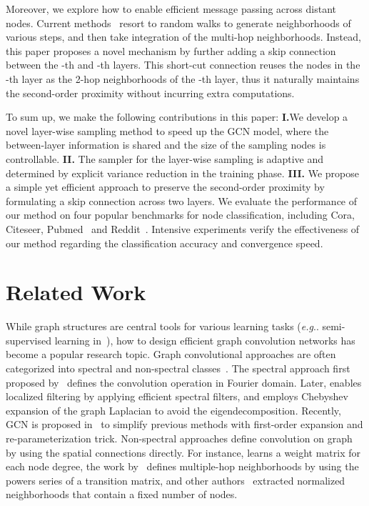 \documentclass{article}
\makeatletter
\DeclareRobustCommand\onedot{\futurelet\@let@token\@onedot}
\def\@onedot{\ifx\@let@token.\else.\null\fi\xspace}
\def\eg{\emph{e.g}\onedot} \def\Eg{\emph{E.g}\onedot}
\makeatother
\begin{document}
Moreover, we explore how to enable efficient message passing across distant nodes. Current methods~\cite{perozzi2014deepwalk,such2017robust} resort to random walks to generate neighborhoods of various steps, and then take integration of the multi-hop neighborhoods. Instead, this paper proposes a novel mechanism by further adding a skip connection between the -th and -th layers. This short-cut connection reuses the nodes in the -th layer as the 2-hop neighborhoods of the -th layer, thus it naturally maintains the second-order proximity without incurring extra computations.

To sum up, we make the following contributions in this paper: \textbf{I.}We develop a novel layer-wise sampling method to speed up the GCN model, where the between-layer information is shared and the size of the sampling nodes is controllable. \textbf{II.} The sampler for the layer-wise sampling is adaptive and determined by explicit variance reduction in the training phase. \textbf{III.} We propose a simple yet efficient approach to preserve the second-order proximity by formulating a skip connection across two layers.
We evaluate the performance of our method on four popular benchmarks for node classification, including Cora, Citeseer, Pubmed~\cite{sen2008collective} and Reddit~\cite{hamilton2017inductive}. Intensive experiments verify the effectiveness of our method regarding the classification accuracy and convergence speed.

\section{Related Work}

While graph structures are central tools for various learning tasks (\eg semi-supervised learning in~\cite{liu2012robust,kipf2016semi}), how to design efficient graph convolution networks has become a popular research topic.
Graph convolutional approaches are often categorized into spectral and non-spectral classes~\cite{velivckovic2017graph}.  The spectral approach first proposed by~\cite{bruna2013spectral} defines the convolution operation in Fourier domain. Later, \cite{henaff2015deep} enables localized filtering by applying efficient spectral filters, and \cite{defferrard2016convolutional} employs Chebyshev expansion of the graph Laplacian to avoid the eigendecomposition.
Recently, GCN is proposed in~\cite{kipf2016semi} to simplify previous methods with first-order expansion and re-parameterization trick.
Non-spectral approaches define convolution on graph by using the spatial connections directly.
For instance, \cite{duvenaud2015convolutional} learns a weight matrix for each node degree, the work by~\cite{atwood2016diffusion} defines multiple-hop neighborhoods by using the powers series of a transition matrix, and other authors~\cite{niepert2016learning} extracted normalized neighborhoods
that contain a fixed number of nodes.
\end{document}
